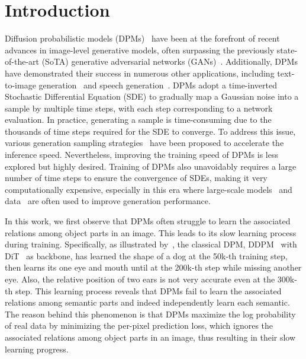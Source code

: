 \documentclass[final]{cvpr}
\begin{document}
\section{Introduction}
Diffusion probabilistic models (DPMs)~\cite{dhariwal2021diffusion,rombach2022high} 
have been at the forefront of recent advances in image-level
generative models,
often surpassing the previously state-of-the-art (SoTA)
generative adversarial networks (GANs)~\cite{brock2018large,wu2019logan,razavi2019generating}. 
Additionally, DPMs have demonstrated their success in numerous other applications, 
including text-to-image generation~\cite{rombach2022high}
and speech generation~\cite{jeong2021diff}.   
DPMs adopt a time-inverted Stochastic Differential Equation (SDE) to gradually map a Gaussian noise into a sample by multiple time steps,
with each step corresponding to a network evaluation.
In practice, generating a sample is time-consuming due to the thousands of time steps required for the SDE to converge.  
To address this issue, various generation sampling strategies~\cite{ho2020denoising,lu2022dpm,salimans2022progressive} 
have been proposed to accelerate the inference speed. 
Nevertheless, 
improving the training speed of DPMs is 
less explored but highly desired. 
Training of DPMs also unavoidably requires a large number of time steps to ensure the convergence of SDEs, 
making it very computationally expensive,
especially in this era where large-scale models~\cite{dhariwal2021diffusion,peebles2022scalable} and data~\cite{imagenet_cvpr09,schuhmann2022laion,gao2021luss} 
are often used to improve generation performance. 



In this work, we first observe that DPMs often struggle to learn the associated relations among object parts  in an image. 
This leads to its slow learning process during training.   
Specifically, as illustrated by~, 
 the classical DPM, DDPM~\cite{ho2020denoising} with DiT~\cite{peebles2022scalable} as backbone,  
 has learned the shape of a dog at the 50k-th training step,
 then learns its one eye and mouth until at the 200k-th step while missing another eye.
 Also, the relative position of two ears is not very accurate even at the 300k-th step.   
 This learning process reveals that DPMs fail to 
learn the associated relations among semantic parts
and indeed independently learn each semantic.  The reason behind this phenomenon is that DPMs maximize the log probability of real data by minimizing the per-pixel prediction loss, 
which ignores the associated relations among object parts in an image, thus resulting in their slow learning progress.  
 
\end{document}
